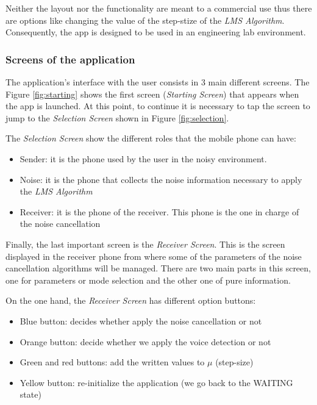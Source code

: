 \documentclass[11pt,a4paper,english]{book}  %
\theoremstyle{definition}  %
\theoremstyle{plain}  %
\theoremstyle{remark}  %
\begin{document}
	Neither the layout nor the functionality are meant to a commercial use thus there are options like changing the value of the step-stize of the \textit{LMS Algorithm}. Consequently, the app is designed to be used in an engineering lab environment.
	
	
	\subsubsection{Screens of the application}
	
	The application's interface with the user consists in 3 main different screens. The Figure \ref{fig:starting} shows the first screen (\textit{Starting Screen}) that appears when the app is launched. At this point, to continue it is necessary to tap the screen to jump to the \textit{Selection Screen} shown in Figure \ref{fig:selection}.
	
	The \textit{Selection Screen} show the different roles that the mobile phone can have:
	
	\begin{itemize}
	\item Sender: it is the phone used by the user in the noisy environment.
	\item Noise: it is the phone that collects the noise information necessary to apply the \textit{LMS Algorithm}
	\item Receiver: it is the phone of the receiver. This phone is the one in charge of the noise cancellation
	\end{itemize}
	
	
	Finally, the last important screen is the \textit{Receiver Screen}. This is the screen displayed in the receiver phone from where some of the parameters of the noise cancellation algorithms will be managed. There are two main parts in this screen, one for parameters or mode selection and the other one of pure information.
	
	On the one hand, the \textit{Receiver Screen} has different option buttons:
	
	\begin{itemize}
	\item Blue button: decides whether apply the noise cancellation or not
	\item Orange button: decide whether we apply the voice detection or not
	\item Green and red buttons: add the written values to $\mu$ (step-size)
	\item Yellow button: re-initialize the application (we go back to the WAITING state)
	\end{itemize}
	
\end{document}
